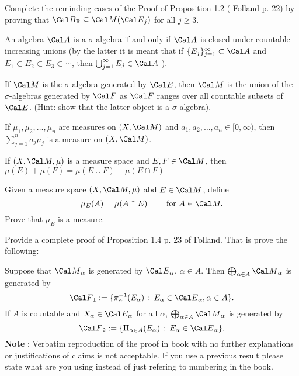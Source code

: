  Complete the reminding cases of the Proof of Proposition 1.2 ( Folland p. 22) by proving 
that ${\Cal B}_{\Bbb R} \subseteq {\Cal M}( {\Cal E}_j ) $ for all $j \ge 3$. 

\endproclaim


 An algebra $\Cal A$ is a $\sigma$-algebra if and only if $\Cal A$ is closed under countable increasing unions
(by the latter it is meant that if $\{E_j\}_{j=1}^{\infty} \subset {\Cal A}$ and 
$E_1 \subset E_2 \subset E_3 \subset \cdots $, then $\bigcup_{j=1}^{\infty} E_j \in {\Cal A} $ ).  


\endproclaim 

  If $ {\Cal M}$ is the $\sigma$-algebra generated by $\Cal E$, then $\Cal M$ is the union of the $\sigma$-algebras generated by $\Cal F$ as $\Cal F$ ranges over all countable subsets of $\Cal E$. (Hint: show that the latter object is a $\sigma$-algebra). 

\endproclaim



 If $\mu_1, \mu_2, \dots, \mu_n$ are measures on $(X, \Cal M)$ and $ a_1, a_2, \dots, a_n \in [0, \infty)$, then $\sum_{j=1}^n a_j \mu_j$ is a measure on $(X, \Cal M)$. 

\endproclaim


 If $(X, \Cal M, \mu)$ is a measure space and $E, F \in \Cal M$, then $ \mu(E) + \mu(F) = \mu(E \cup F) + \mu(E \cap F)$


\endproclaim



 Given a measure space $(X, \Cal M, \mu)$ abd $E \in \Cal M$, define $$\mu_E(A) = \mu (A \cap E) \qquad \text{ for } A \in \Cal M. $$ Prove that $\mu_E$ is a measure. 


\endproclaim


 Provide a complete proof of Proposition 1.4 p. 23 of Folland. That is prove the following:

Suppose that ${\Cal M}_{\alpha}$ is generated by ${\Cal E}_{\alpha}$, $\alpha \in A$. Then $\bigoplus_{\alpha \in A} {\Cal M}_{\alpha}$ is generated by $$\F_1 := \{ \pi^{-1}_{\alpha} (E_{\alpha}) \, : \, E_{\alpha} \in {\Cal E}_{\alpha}, \alpha \in A \}. $$
If $A$ is countable and $X_{\alpha} \in {\Cal E}_{\alpha}$ for all $\alpha$, $\bigoplus_{\alpha \in A} {\Cal M}_{\alpha}$ is generated by 
$$\F_2 := \{ \Pi_{\alpha \in A} (E_{\alpha}) \, : \, E_{\alpha} \in {\Cal E}_{\alpha} \}. $$
\endproclaim 
{\bf Note} : Verbatim reproduction of the proof in book with no further explanations or justifications of claims is  not acceptable. If you use a previous result please state  what are you using instead of just refering to numbering in the book. 

 


\enddocument























